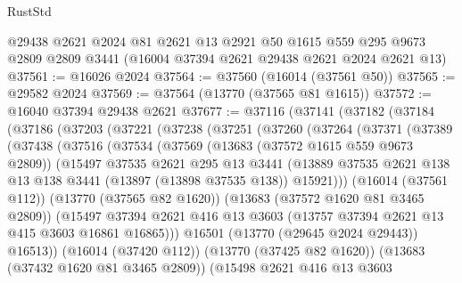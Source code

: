 \begin{lexlean}{RustStd}
\begin{coremodule}
    @29438
    @2621
    @2024
    @81
    @2621
    @13
    @2921
    @50
    @1615
    @559
    @295
    @9673
    @2809
    @2809
    @3441
    (@16004 @37394 @2621 @29438 @2621 @2024 @2621 @13)
@37561 := @16026 @2024
@37564 := @37560 (@16014 (@37561 @50))
@37565 := @29582 @2024
@37569 := @37564 (@13770 (@37565 @81 @1615))
@37572 := @16040 @37394 @29438 @2621
@37677 := @37116
    (@37141
      (@37182
        (@37184
          (@37186
            (@37203
              (@37221
                (@37238
                  (@37251
                    (@37260
                      (@37264
                        (@37371
                          (@37389
                            (@37438
                              (@37516
                                (@37534
                                  (@37569
                                    (@13683 (@37572 @1615 @559 @9673 @2809))
                                    (@15497
                                      @37535
                                      @2621
                                      @295
                                      @13
                                      @3441
                                      (@13889
                                        @37535
                                        @2621
                                        @138
                                        @13
                                        @138
                                        @3441
                                        (@13897 (@13898 @37535 @138))
                                        @15921)))
                                  (@16014 (@37561 @112))
                                  (@13770 (@37565 @82 @1620))
                                  (@13683 (@37572 @1620 @81 @3465 @2809))
                                  (@15497
                                    @37394
                                    @2621
                                    @416
                                    @13
                                    @3603
                                    (@13757 @37394 @2621 @13 @415 @3603 @16861 @16865)))
                                @16501
                                (@13770 (@29645 @2024 @29443))
                                @16513))
                            (@16014 (@37420 @112))
                            (@13770 (@37425 @82 @1620))
                            (@13683 (@37432 @1620 @81 @3465 @2809))
                            (@15498
                              @2621
                              @416
                              @13
                              @3603

\end{coremodule}
\end{lexlean}
